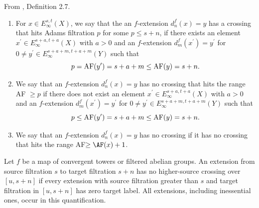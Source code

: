 \begin{definition}
\label{paper:2.7}
From \cite{LWX126}, Definition 2.7.\par
\label{def:98skj23}
\begin{enumerate}[leftmargin=*]
    \item For $x\in E_\infty^{s,t}(X)$, we say that the an $f$-extension $d_n^{f}(x)=y$ has a crossing that hits Adams filtration $p$ for some $p \leq s+n$, if there exists an element $x^\prime\in E_\infty^{s+a,t+a}(X)$ with $a>0$ and an $f$-extension $d_m^{f}(x^\prime)=y^\prime$ for $0\neq y^\prime\in E^{s+a+m, t+a+m}_\infty(Y)$ such that
    $$p = \textup{AF}(y^\prime) = s+a+m\le \textup{AF}(y) = s+n.$$
    \item We say that an $f$-extension $d_n^{f}(x)=y$ has no crossing that hits the range AF $\ge p$ if there does not exist an element $x^\prime\in E_\infty^{s+a,t+a}(X)$ with $a>0$ and an $f$-extension $d_m^{f}(x^\prime)=y^\prime$ for $0\neq y^\prime\in E^{s+a+m, t+a+m}_\infty(Y)$ such that
    $$p\le \textup{AF}(y^\prime) = s+a+m\le \textup{AF}(y) = s+n.$$
    \item We say that an $f$-extension $d_n^{f}(x)=y$ has no crossing if it has no crossing that hits the range AF$\ge \AF(x) + 1$.
\end{enumerate}

Let $f$ be a map of convergent towers or filtered abelian groups. An extension from source filtration $s$ to target filtration $s+n$ has no higher-source crossing over $[u,s+n]$ if every extension with source filtration greater than $s$ and target filtration in $[u,s+n]$ has zero target label. All extensions, including inessential ones, occur in this quantification.



\sketch
\end{definition}

